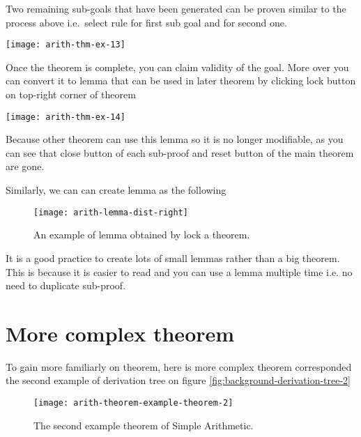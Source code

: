 \documentclass[master.tex]{subfiles}
\begin{document}
Two remaining sub-goals that have been generated can be proven similar to the
process above i.e.\ select rule  for first sub goal and
 for second one.

\begin{center}
\texttt{[image: arith-thm-ex-13]}
\end{center}

Once the theorem is complete, you can claim validity of the goal. More over you
can convert it to lemma that can be used in later theorem by clicking lock
button on top-right corner of theorem

\begin{center}
\texttt{[image: arith-thm-ex-14]}
\end{center}

Because other theorem can use this lemma so it is no longer modifiable, as you
can see that close button of each sub-proof and reset button of the main theorem
are gone.

\newpage

Similarly, we can can create lemma  as the following

\hspace{1ex}

\begin{figure}[H]
    \centering
\begin{minipage}{\textwidth}
    \texttt{[image: arith-lemma-dist-right]}
\end{minipage}
\caption{An example of lemma obtained by lock a theorem.}
\label{fig:arith-lemma-dist-right}
\end{figure}

\hspace{1ex}

It is a good practice to create lots of small lemmas rather than a big theorem.
This is because it is easier to read and you can use a lemma multiple time i.e.
no need to duplicate sub-proof.


\section{More complex theorem}

To gain more familiarly on theorem, here is more complex theorem corresponded
the second example of derivation tree on figure \ref{fig:background-derivation-tree-2}

\begin{figure}[H]
    \centering
\begin{minipage}{\textwidth}
    \texttt{[image: arith-theorem-example-theorem-2]}
\end{minipage}
\caption{The second example theorem of Simple Arithmetic.}
\label{fig:arith-theorem-example-theorem-2}
\end{figure}
\end{document}
